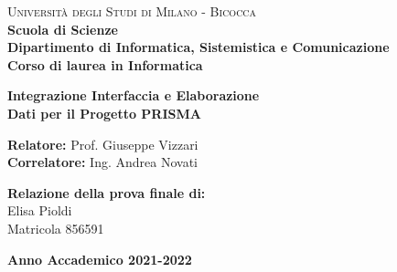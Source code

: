 \begin{titlepage}
        
        \noindent
        \begin{minipage}[t]{0.19\textwidth}
        \end{minipage}
        \begin{minipage}[t]{0.81\textwidth}
        {
                {\textsc{Università degli Studi di Milano - Bicocca}} \\
                \textbf{Scuola di Scienze} \\
                \textbf{Dipartimento di Informatica, Sistemistica e Comunicazione} \\
                \textbf{Corso di laurea in Informatica} \\
                \par
        }
        \end{minipage}
        
	\vspace{40mm}
        
	\begin{center}
            {\LARGE{
                    \textbf{Integrazione Interfaccia e Elaborazione \\ Dati per il Progetto PRISMA}
                    \par
            }}
        \end{center}
        
        \vspace{40mm}

        \noindent
        {\large \textbf{Relatore:} Prof. Giuseppe Vizzari} \\

        \noindent
        {\large \textbf{Correlatore:} Ing. Andrea Novati}
        
        \vspace{15mm}

        \begin{flushright}
            {\large \textbf{Relazione della prova finale di:}} \\
            \large{Elisa Pioldi} \\
            \large{Matricola 856591} 
        \end{flushright}
        
        \vspace{30mm}
        \begin{center}
            {\large{\bf Anno Accademico 2021-2022}}
        \end{center}

        \restoregeometry
        
\end{titlepage}
